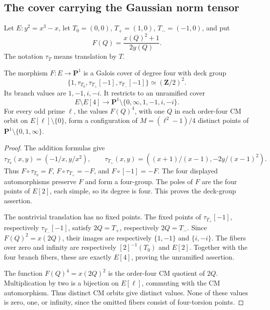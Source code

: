 \subsection{The cover carrying the Gaussian norm tensor}

Let \(E:y^2=x^3-x\), let \(T_0=(0,0)\),
\(T_+=(1,0)\), \(T_-=(-1,0)\), and put
\[
                         F(Q)=\frac{x(Q)^2+1}{2y(Q)}.
\]
The notation \(\tau_T\) means translation by \(T\).

\begin{lemma}\label{lem:gaussian-norm-v4-cover}
The morphism \(F:E\to\mathbf P^1\) is a Galois cover
of degree four with deck group
\[
 \{1,\tau_{T_0},\tau_{T_+}[-1],\tau_{T_-}[-1]\}
                              \simeq(\mathbf Z/2)^2.
\]
Its branch values are \(1,-1,i,-i\).  It restricts to
an unramified cover
\[
 E\setminus E[4]\longrightarrow
       \mathbf P^1\setminus\{0,\infty,1,-1,i,-i\}.
\]
For every odd prime \(\ell\), the values \(F(Q)^4\),
with one \(Q\) in each order-four CM orbit on
\(E[\ell]\setminus\{0\}\), form a configuration of
\(M=(\ell^2-1)/4\) distinct points of
\(\mathbf P^1\setminus\{0,1,\infty\}\).
\end{lemma}
\begin{proof}
The addition formulas give
\[
 \tau_{T_0}(x,y)=(-1/x,y/x^2),\qquad
 \tau_{T_+}(x,y)=((x+1)/(x-1),-2y/(x-1)^2).
\]
Thus \(F\circ\tau_{T_0}=F\),
\(F\circ\tau_{T_+}=-F\), and \(F\circ[-1]=-F\).
The four displayed automorphisms preserve \(F\) and form
a four-group.  The poles of \(F\) are the four points
of \(E[2]\), each simple, so its degree is four.  This
proves the deck-group assertion.

The nontrivial translation has no fixed points.  The fixed
points of \(\tau_{T_+}[-1]\), respectively
\(\tau_{T_-}[-1]\), satisfy \(2Q=T_+\), respectively
\(2Q=T_-\).  Since \(F(Q)^2=x(2Q)\), their images are
respectively \(\{1,-1\}\) and \(\{i,-i\}\).
The fibers over zero and infinity are respectively
\([2]^{-1}(T_0)\) and \(E[2]\).  Together with the four
branch fibers, these are exactly \(E[4]\), proving the
unramified assertion.

The function \(F(Q)^4=x(2Q)^2\) is the order-four CM
quotient of \(2Q\).  Multiplication by two is a bijection
on \(E[\ell]\), commuting with the CM automorphism.
Thus distinct CM orbits give distinct values.  None of
these values is zero, one, or infinity, since the omitted
fibers consist of four-torsion points.
\end{proof}

